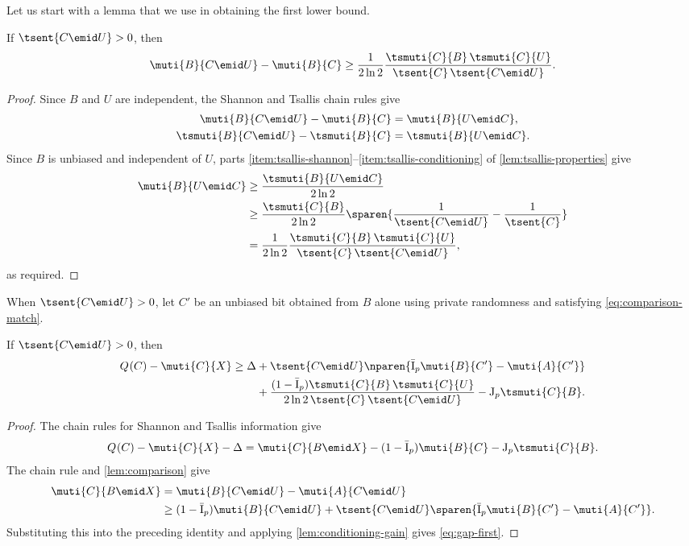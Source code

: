 Let us start with a lemma that we use in obtaining the first
lower bound.
\begin{lemma}
\label{lem:conditioning-gain}
If $\tsent{C\emid U}>0$, then
\begin{equation*}
  \muti{B}{C\emid U}-\muti{B}{C}
  \ge
  \frac{1}{2\ln 2}
  \frac{\tsmuti{C}{B}\,\tsmuti{C}{U}}
  {\tsent{C}\,\tsent{C\emid U}}.
\end{equation*}
\end{lemma}
\begin{proof}
Since $B$ and $U$ are independent, the Shannon and Tsallis
chain rules give
\begin{align*}
  \muti{B}{C\emid U}-\muti{B}{C}
  &=\muti{B}{U\emid C},\\
  \tsmuti{B}{C\emid U}-\tsmuti{B}{C}
  &=\tsmuti{B}{U\emid C}.
\end{align*}
Since $B$ is unbiased and independent of $U$, parts
\ref{item:tsallis-shannon}--\ref{item:tsallis-conditioning}
of \autoref{lem:tsallis-properties} give
\begin{align*}
  \muti{B}{U\emid C}
  &\ge\frac{\tsmuti{B}{U\emid C}}{2\ln2}\\
  &\ge\frac{\tsmuti{C}{B}}{2\ln2}
  \sparen{\frac1{\tsent{C\emid U}}-\frac1{\tsent{C}}}\\
  &=\frac{1}{2\ln 2}
    \frac{\tsmuti{C}{B}\,\tsmuti{C}{U}}
         {\tsent{C}\,\tsent{C\emid U}},
\end{align*}
as required.
\end{proof}

When $\tsent{C\emid U}>0$, let $C'$ be an unbiased bit obtained
from $B$ alone using private randomness and satisfying
\eqref{eq:comparison-match}.

\begin{lemma}
\label{lem:gap-first}
If $\tsent{C\emid U}>0$, then
\begin{equation}
  \label{eq:gap-first}
  \begin{aligned}
    \qent{C}-\muti{C}{X}\ge \Delta
    &+\tsent{C\emid U}
    \nparen{\qI\muti{B}{C'}-\muti{A}{C'}}\\
    &+\frac{(1-\qI)\tsmuti{C}{B}\,\tsmuti{C}{U}}
    {2\ln2\,\tsent{C}\,\tsent{C\emid U}}
    -\qJ\tsmuti{C}{B}.
  \end{aligned}
\end{equation}
\end{lemma}
\begin{proof}
The chain rules for Shannon and Tsallis information give
\begin{align*}
  \qent{C}-\muti{C}{X}-\Delta
  =\muti{C}{B\emid X}
  -(1-\qI)\muti{B}{C}-\qJ\tsmuti{C}{B}.
\end{align*}
The chain rule and \autoref{lem:comparison} give
\begin{align*}
  \muti{C}{B\emid X}
  &=\muti{B}{C\emid U}-\muti{A}{C\emid U}\\
  &\ge(1-\qI)\muti{B}{C\emid U}
  +\tsent{C\emid U}
  \sparen{\qI\muti{B}{C'}-\muti{A}{C'}}.
\end{align*}
Substituting this into the preceding identity and applying
\autoref{lem:conditioning-gain} gives \eqref{eq:gap-first}.
\end{proof}

